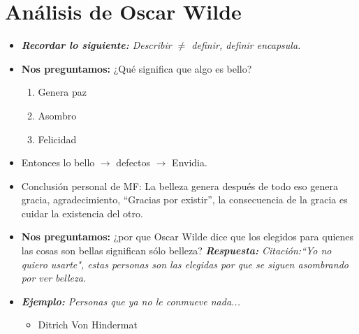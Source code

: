 \section{Análisis de Oscar Wilde}
\begin{itemize}
    \item \emph{\textbf{Recordar lo siguiente: }Describir $\neq $ definir, definir encapsula.} 
    \item \textbf{Nos preguntamos:} ¿Qué significa que algo es bello?
        \begin{enumerate}
            \item Genera paz 
            \item Asombro 
            \item Felicidad
        \end{enumerate}
    
    \item Entonces lo bello $\rightarrow$ defectos $\rightarrow$ Envidia.
    \item Conclusión personal de MF: La belleza genera después de todo eso genera gracia, agradecimiento, ``Gracias por existir'', la consecuencia de la gracia es cuidar la existencia del otro.
    \item \textbf{Nos preguntamos:} ¿por que Oscar Wilde dice que los elegidos para quienes las cosas son bellas significan sólo belleza? \emph{\textbf{Respuesta:} \emph{Citación:``Yo no quiero usarte"}, estas personas son las elegidas por que se siguen asombrando por ver belleza.}
    \item \emph{\textbf{Ejemplo: }Personas que ya no le conmueve nada...  }
        \begin{itemize}
            \item Ditrich Von Hindermat
        \end{itemize}
\end{itemize}




